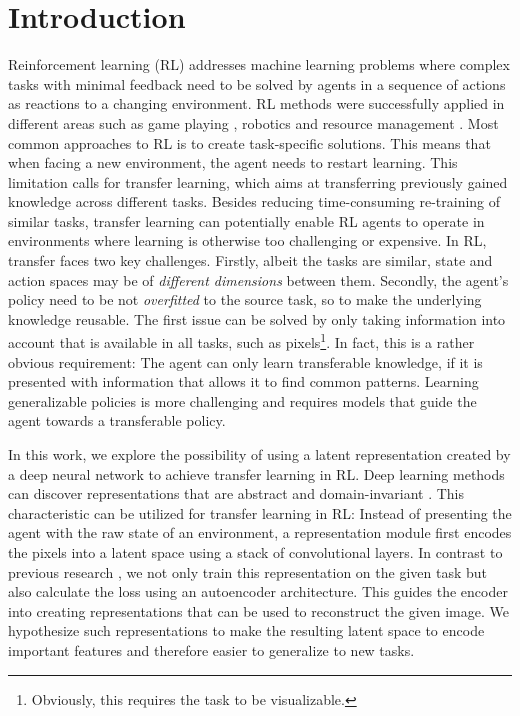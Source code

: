 \section{Introduction}
\label{sec:introduction}

Reinforcement learning (RL) addresses machine learning problems where complex tasks with minimal feedback \citep{taylor2007cross} need to be solved by agents in a sequence of actions as reactions to a changing environment. RL methods were successfully applied in different areas such as game playing \citep{silver2016mastering}, robotics \citep{levine2016end} and resource management \citep{mao2016resource}. 
Most common approaches to RL is to create task-specific solutions. This means that when facing a new environment, the agent needs to restart learning. This limitation calls for transfer learning, which aims at transferring previously gained knowledge across different tasks. Besides reducing time-consuming re-training of similar tasks, transfer learning can potentially enable RL agents to operate in environments where learning is otherwise too challenging \citep{barreto2018transfer} or expensive. In RL, transfer faces two key challenges. Firstly, albeit the tasks are similar, state and action spaces may be of \textit{different dimensions} between them. Secondly, the agent's policy need to be not \textit{overfitted} to the source task, so to make the underlying knowledge reusable. %
The first issue can be solved by only taking information into account that is available in all tasks, such as pixels\footnote{Obviously, this requires the task to be visualizable.}. In fact, this is a rather obvious requirement: The agent can only learn transferable knowledge, if it is presented with information that allows it to find common patterns. Learning generalizable policies is more challenging and requires models that guide the agent towards a transferable policy. 



In this work, we explore the possibility of using a latent representation created by a deep neural network to achieve transfer learning in RL. Deep learning methods can discover representations that are abstract and domain-invariant \citep{bengio2012deep, ganin2014unsupervised}. This characteristic can be utilized for transfer learning in RL: Instead of presenting the agent with the raw state of an environment, a representation module first encodes the pixels into a latent space using a stack of convolutional layers. In contrast to previous research \citep[see e.g.][]{DQN, DuelingDQN}, we not only train this representation on the given task but also calculate the loss using an autoencoder architecture. This guides the encoder into creating representations that can be used to reconstruct the given image. We hypothesize such representations to make the resulting latent space to encode important features and therefore easier to generalize to new tasks.


